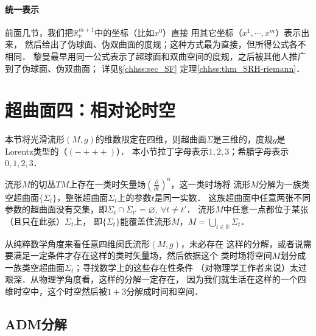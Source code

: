 \paragraph{统一表示}
前面几节，我们把$\mathbb{R}^{m+1}_\nu$中的坐标（比如$x^0$）直接
用其它坐标（$x^1,\cdots,x^m$）表示出来，
然后给出了伪球面、伪双曲面的度规；这种方式最为直接，但所得公式各不相同．
黎曼最早用同一公式表示了超球面和双曲空间的度规，之后被其他人推广到了伪球面、伪双曲面；
详见\S \ref{chhss:sec_SF} 定理\ref{chhss:thm_SRH-riemann}．




\section{超曲面四：相对论时空}\label{chsm:sec_3+1decomposition}
本节将光滑流形$(M,g)$的维数限定在四维，则超曲面$\Sigma$是三维的，度规$g$是Lorentz类型的（$(-+++)$）．
本小节拉丁字母表示$1,2,3$；希腊字母表示$0,1,2,3$．


流形$M$的切丛$TM$上存在一类时矢量场$(\frac{\partial }{\partial t})^a$，这一类时场将
流形$M$分解为一族类空超曲面$\{\Sigma_t\}$，整张超曲面$\Sigma_t$上的参数$t$是同一实数．
这族超曲面中任意两张不同参数的超曲面没有交集，即$\Sigma_t \cap \Sigma_{t'}=\varnothing,
\ \forall t \neq t' $．
流形$M$中任意一点都位于某张（且只在此张）$\Sigma_t$上，
即$\{\Sigma_t\}$能覆盖住流形$M$，$M=\bigcup_{t\in\mathbb{R}} \Sigma_t$．

从纯粹数学角度来看任意四维闵氏流形$(M,g)$，未必存在
这样的分解，或者说需要满足一定条件才存在这样的类时矢量场，然后依据这个
类时场将空间$M$划分成一族类空超曲面$\Sigma_t$；寻找数学上的这些存在性条件
（对物理学工作者来说）太过艰深．从物理学角度看，这样的分解一定存在，
因为我们就生活在这样的一个四维时空中，这个时空然后被$1+3$分解成时间和空间．




\subsection{ADM分解}\label{chsm:sec_ADM}

